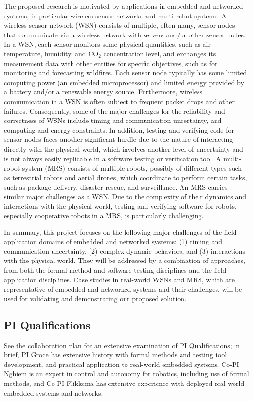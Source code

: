   The proposed research is motivated by applications in embedded and networked systems, in particular wireless sensor networks and multi-robot systems.
  A wireless sensor network (WSN) consists of multiple, often many, sensor nodes that communicate via a wireless network with servers and/or other sensor nodes.
  In a WSN, each sensor monitors some physical quantities, such as air temperature, humidity, and CO$_{2}$ concentration level, and exchanges its measurement data with other entities %
  for specific objectives, such as for monitoring and forecasting wildfires.
  Each sensor node typically has some limited computing power (an embedded microprocessor) and limited energy provided by a battery and/or a renewable energy source.
  Furthermore, wireless communication in a WSN is often subject to frequent %
  packet drops and other failures.
  Consequently, some of the major challenges for the reliability and correctness of WSNs include timing and communication uncertainty, and computing and energy constraints.
  In addition, testing and verifying  code for sensor nodes faces another significant hurdle due to the nature of interacting directly with the physical world, which involves another level of uncertainty and is not always easily replicable in a software testing or verification tool.
  A multi-robot system (MRS) consists of multiple robots, possibly of different types such as terrestrial robots and aerial drones, which coordinate to perform certain tasks, such as package delivery, disaster rescue, and surveillance.
  An MRS carries similar major challenges as a WSN.
  Due to the complexity of their dynamics and interactions with the physical world, testing and verifying software for robots, especially cooperative robots in a MRS, is particularly challenging.

  In summary, this project focuses on the following major challenges of the field application domains of embedded and networked systems:
  (1) timing and communication uncertainty,
  (2) complex dynamic behaviors, and
  (3) interactions with the physical world.
  They will be addressed by a combination of approaches, from both the formal method and software testing disciplines and the field application disciplines.
  Case studies in real-world WSNs and MRS, which are representative of embedded and networked systems and their challenges, will be used for validating and demonstrating our proposed solution.

\subsection{PI Qualifications}

See the collaboration plan for an extensive examination of PI Qualifications; in brief, PI Groce has extensive history with formal methods and testing tool development, and practical application to real-world embedded systems.  Co-PI Nghiem is an expert in control and autonomy for robotics, including use of formal methods, and   Co-PI Flikkema has extensive experience with deployed real-world embedded systems and networks.


